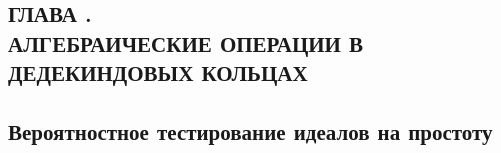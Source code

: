 \documentclass[_00_dissertation.tex]{subfiles}
\begin{document}
\onlyinsubfile{
    \renewcommand{\contentsname}{ОГЛАВЛЕНИЕ}
    \setcounter{tocdepth}{3}
    \tableofcontents
}

\newpage
\begin{center}
    \section*{ГЛАВА .\\ АЛГЕБРАИЧЕСКИЕ ОПЕРАЦИИ В ДЕДЕКИНДОВЫХ КОЛЬЦАХ}\label{ch:Primality}
\end{center}

\subsection{Вероятностное тестирование идеалов на простоту}
\end{document}
